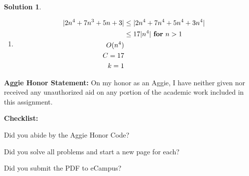 \documentclass{article}
\theoremstyle{plain}
\theoremstyle{break}
\newtheorem{solution}{Solution}
\newcommand{\honor}{\noindent \textbf{Aggie Honor Statement: }On my honor as an Aggie, I have neither
  given nor received any unauthorized aid on any portion of the academic work included in this assignment.
}
\newcommand{\checklist}{\noindent\textbf{Checklist:}
\begin{compactenum}
\item Did you abide by the Aggie Honor Code?
\item Did you solve all problems and start a new page for each? 
\item Did you submit the PDF to eCampus?
\end{compactenum}
}
\begin{document}
\begin{solution}
\begin{enumerate}
\begin{equation}
\begin{split}
O(n) \\
C = 6 \\
k = 1
\end{split} 
\end{equation}
\item \begin{equation}
\begin{split}
|2n^4+7n^3+5n+3| & \leq |2n^4+7n^4+5n^4+3n^4| \\
& \leq 17|n^4|  \textnormal{ \textbf{for} } n > 1 \\
O(n^4) \\
C = 17 \\
k = 1
\end{split} 
\end{equation}

\end{enumerate}
\end{solution}

\bigskip
\honor

\bigskip
\checklist
\end{document}
